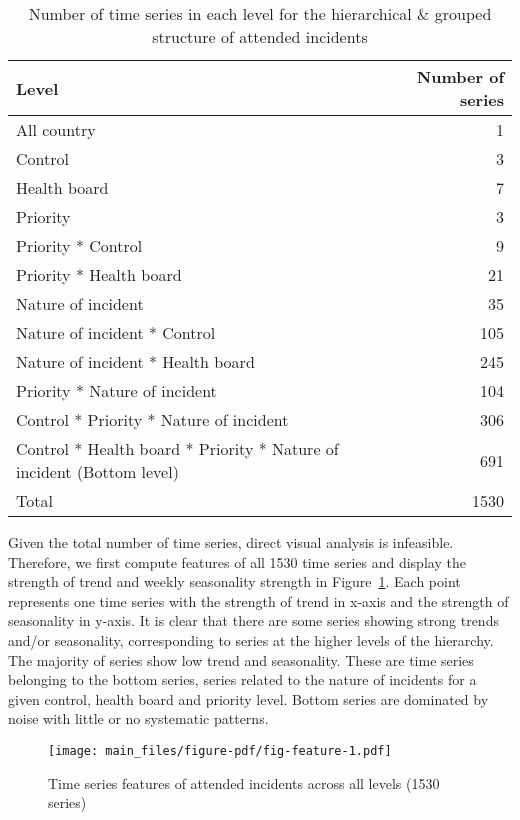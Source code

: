 \documentclass[
  authoryear,
  preprint,
  3p]{elsarticle}
\begin{document}
\hypertarget{tbl-hierarchy}{}
\begin{table}
\caption{\label{tbl-hierarchy}Number of time series in each level for the hierarchical \& grouped
structure of attended incidents }\tabularnewline

\centering
\begin{tabular}{lr}
\toprule
Level & Number of series\\
\midrule
All country & 1\\
Control & 3\\
Health board & 7\\
Priority & 3\\
Priority * Control & 9\\
\addlinespace
Priority * Health board & 21\\
Nature of incident & 35\\
Nature of incident * Control & 105\\
Nature of incident * Health board & 245\\
Priority * Nature of incident & 104\\
\addlinespace
Control * Priority * Nature of incident & 306\\
Control * Health board * Priority * Nature of incident (Bottom level) & 691\\
Total & 1530\\
\bottomrule
\end{tabular}
\end{table}

Given the total number of time series, direct visual analysis is
infeasible. Therefore, we first compute features of all 1530 time series
\citep{m3pca} and display the strength of trend and weekly seasonality
strength in Figure~\ref{fig-feature}. Each point represents one time
series with the strength of trend in x-axis and the strength of
seasonality in y-axis. It is clear that there are some series showing
strong trends and/or seasonality, corresponding to series at the higher
levels of the hierarchy. The majority of series show low trend and
seasonality. These are time series belonging to the bottom series,
series related to the nature of incidents for a given control, health
board and priority level. Bottom series are dominated by noise with
little or no systematic patterns.

\begin{figure}

{\centering \texttt{[image: main\_files/figure-pdf/fig-feature-1.pdf]}

}

\caption{\label{fig-feature}Time series features of attended incidents
across all levels (1530 series)}

\end{figure}
\end{document}
